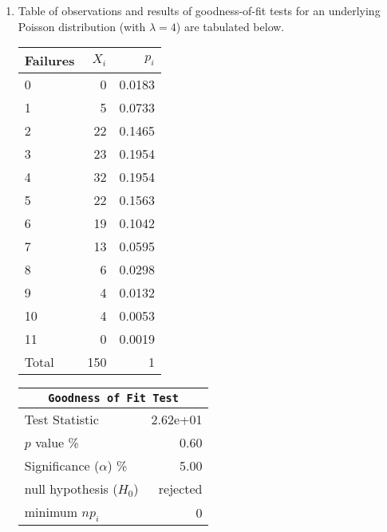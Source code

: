 \begin{enumerate}
\begin{table}[H]
\begin{minipage}{0.4\textwidth}
		\end{minipage}
	\end{table}
	\bigskip
	
	\item Table of observations and results of goodness-of-fit tests for an underlying Poisson distribution (with $ \lambda = 4 $) are tabulated below.
	
	\begin{table}[H]
		\centering
		\begin{minipage}{0.4\textwidth}
			\centering
			\begin{tabular}{@{}lrr@{}}
				\toprule
				Failures & $X_i$ &   $p_i$ \\
				\midrule
				0     &     0 &  0.0183 \\
				1     &     5 &  0.0733 \\
				2     &    22 &  0.1465 \\
				3     &    23 &  0.1954 \\
				4     &    32 &  0.1954 \\
				5     &    22 &  0.1563 \\
				6     &    19 &  0.1042 \\
				7     &    13 &  0.0595 \\
				8     &     6 &  0.0298 \\
				9     &     4 &  0.0132 \\
				10    &     4 &  0.0053 \\
				11    &     0 &  0.0019 \\
				\midrule
				Total &   150 &       1 \\
				\bottomrule
			\end{tabular}
			
		\end{minipage}
		\begin{minipage}{0.4\textwidth}
			\centering
			\begin{tabular}{@{}lr@{}}
				\toprule
				\multicolumn{2}{c}{\texttt{Goodness of Fit Test}} \\
				\midrule
				Test Statistic             &  2.62e+01 \\
				$p$ value \%               &      0.60 \\
				Significance ($\alpha$) \% &      5.00 \\
				null hypothesis ($H_0$)    &  rejected \\
				minimum $n p_i$            &         0 \\
				\bottomrule
			\end{tabular}
			

\end{minipage}
\end{table}
\end{enumerate}
